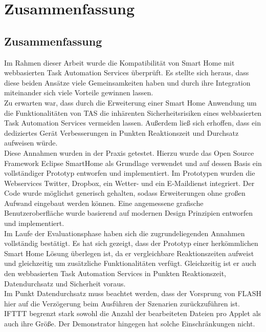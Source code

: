 \chapter{Zusammenfassung}
\label{chap:ausblick}

\section{Zusammenfassung}
Im Rahmen dieser Arbeit wurde die Kompatibilität von Smart Home mit webbasierten Task Automation Services überprüft. Es stellte sich heraus, dass diese beiden Ansätze viele Gemeinsamkeiten haben und durch ihre Integration miteinander sich viele Vorteile gewinnen lassen.\\

Zu erwarten war, dass durch die Erweiterung einer Smart Home Anwendung um die Funktionalitäten von TAS die inhärenten Sicherheitsrisiken eines webbasierten Task Automation Services vermeiden lassen. Außerdem ließ sich erhoffen, dass ein dediziertes Gerät Verbesserungen in Punkten Reaktionszeit und Durchsatz aufweisen würde.\\

Diese Annahmen wurden in der Praxis getestet. Hierzu wurde das Open Source Framework Eclipse SmartHome als Grundlage verwendet und auf dessen Basis ein vollständiger Prototyp entworfen und implementiert. Im Prototypen wurden die Webservices Twitter, Dropbox, ein Wetter- und ein E-Maildienst integriert. Der Code wurde möglichst generisch gehalten, sodass Erweiterungen ohne großen Aufwand eingebaut werden können. Eine angemessene grafische Benutzeroberfläche wurde basierend auf modernen Design Prinzipien entworfen und implementiert. \\

Im Laufe der Evaluationsphase haben sich die zugrundeliegenden Annahmen vollständig bestätigt. Es hat sich gezeigt, dass der Prototyp einer herkömmlichen Smart Home Lösung überlegen ist, da er vergleichbare Reaktionszeiten aufweist und gleichzeitig um zusätzliche Funktionalitäten verfügt. Gleichzeitig ist er auch den webbasierten Task Automation Services  in Punkten Reaktionszeit, Datendurchsatz und Sicherheit voraus. \\

Im Punkt Datendurchsatz muss beachtet werden, dass der Vorsprung von FLASH hier auf die  Verzögerung beim Ausführen der Szenarien zurückzuführen ist. IFTTT begrenzt stark sowohl die Anzahl der bearbeiteten Dateien pro Applet als auch ihre Größe. Der Demonstrator hingegen hat solche Einschränkungen nicht.

